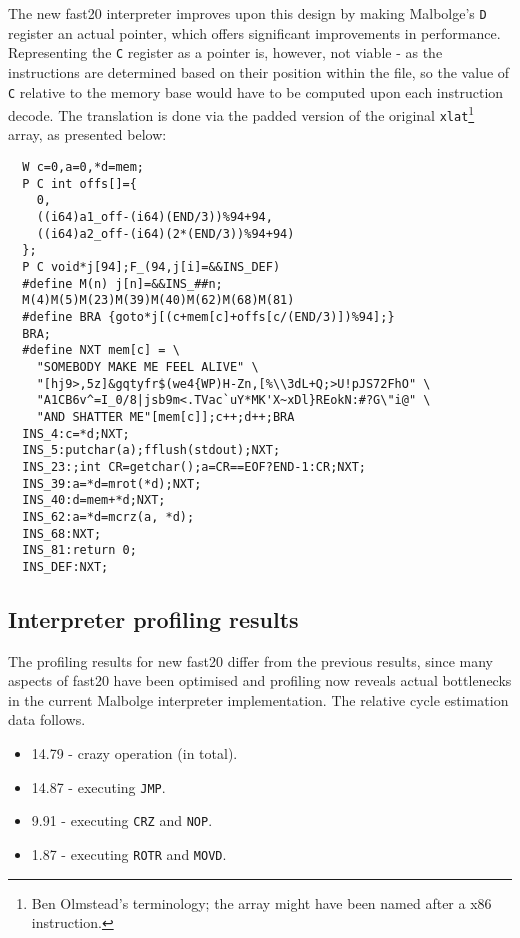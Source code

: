 \par The new fast20 interpreter improves upon this design by making Malbolge's \verb|D| register an actual pointer, which offers significant improvements in performance. Representing the \verb|C| register as a pointer is, however, not viable - as the instructions are determined based on their position within the file, so the value of \verb|C| relative to the memory base would have to be computed upon each instruction decode. The translation is done via the padded version of the original \verb|xlat|\footnote{Ben Olmstead's terminology; the array might have been named after a x86 instruction.} array, as presented below:

\begin{verbatim}
  W c=0,a=0,*d=mem;
  P C int offs[]={
    0,
    ((i64)a1_off-(i64)(END/3))%94+94,
    ((i64)a2_off-(i64)(2*(END/3))%94+94)
  };
  P C void*j[94];F_(94,j[i]=&&INS_DEF)
  #define M(n) j[n]=&&INS_##n;
  M(4)M(5)M(23)M(39)M(40)M(62)M(68)M(81)
  #define BRA {goto*j[(c+mem[c]+offs[c/(END/3)])%94];}
  BRA;
  #define NXT mem[c] = \
    "SOMEBODY MAKE ME FEEL ALIVE" \
    "[hj9>,5z]&gqtyfr$(we4{WP)H-Zn,[%\\3dL+Q;>U!pJS72FhO" \
    "A1CB6v^=I_0/8|jsb9m<.TVac`uY*MK'X~xDl}REokN:#?G\"i@" \
    "AND SHATTER ME"[mem[c]];c++;d++;BRA
  INS_4:c=*d;NXT;
  INS_5:putchar(a);fflush(stdout);NXT;
  INS_23:;int CR=getchar();a=CR==EOF?END-1:CR;NXT;
  INS_39:a=*d=mrot(*d);NXT;
  INS_40:d=mem+*d;NXT;
  INS_62:a=*d=mcrz(a, *d);
  INS_68:NXT;
  INS_81:return 0;
  INS_DEF:NXT;
\end{verbatim}

\subsection{Interpreter profiling results}

\par The profiling results for new fast20 differ from the previous results, since many aspects of fast20 have been optimised and profiling now reveals actual bottlenecks in the current Malbolge interpreter implementation. The relative cycle estimation data follows.

\begin{itemize}
    \item 14.79 - crazy operation (in total).
    \item 14.87 - executing \verb|JMP|.
    \item 9.91 - executing \verb|CRZ| and \verb|NOP|.
    \item 1.87 - executing \verb|ROTR| and \verb|MOVD|.
\end{itemize}

